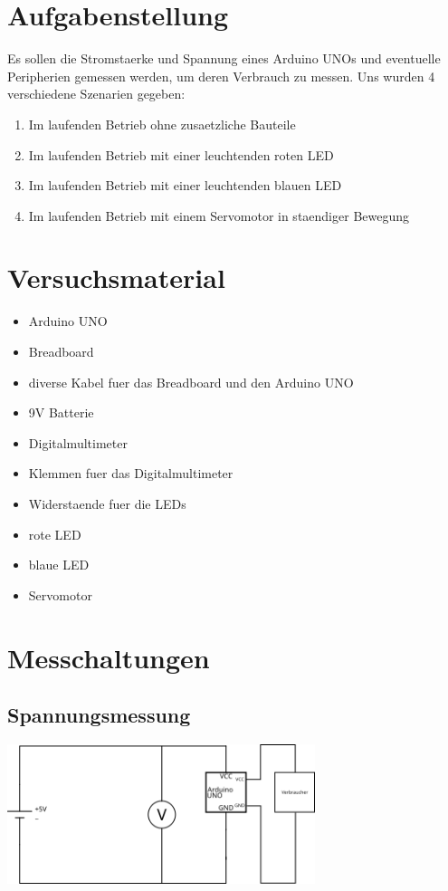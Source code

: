 \documentclass[8pt, letterpaper]{article}
\title{}
\author{Jakob Kirsch}
\date{\parbox{\linewidth}{\centering%
  \today\endgraf\bigskip
  Fach: IT\endgraf\medskip
  Betreuer: Herr Kutzner\endgraf\medskip
}}
\begin{document}
\maketitle
\newpage

\section{Aufgabenstellung}
Es sollen die Stromstaerke und Spannung eines Arduino UNOs und eventuelle Peripherien gemessen werden, um deren Verbrauch zu messen.
Uns wurden 4 verschiedene Szenarien gegeben:

\begin{enumerate}
  \item Im laufenden Betrieb ohne zusaetzliche Bauteile
  \item Im laufenden Betrieb mit einer leuchtenden roten LED
  \item Im laufenden Betrieb mit einer leuchtenden blauen LED
  \item Im laufenden Betrieb mit einem Servomotor in staendiger Bewegung
\end{enumerate}

\section{Versuchsmaterial}
\begin{itemize}
  \item Arduino UNO
  \item Breadboard
  \item diverse Kabel fuer das Breadboard und den Arduino UNO
  \item 9V Batterie
  \item Digitalmultimeter
  \item Klemmen fuer das Digitalmultimeter
  \item Widerstaende fuer die LEDs
  \item rote LED
  \item blaue LED
  \item Servomotor
\end{itemize}

\section{Messchaltungen}
\subsection{Spannungsmessung}
\includegraphics[width=9cm]{volt}
\end{document}
